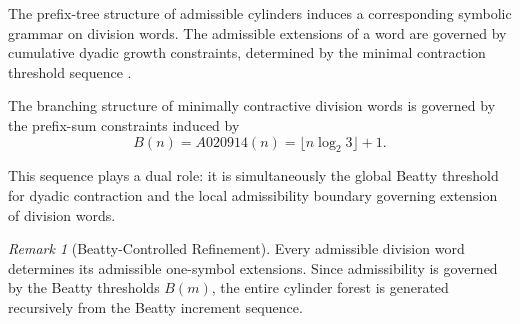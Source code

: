 \documentclass[12pt, oneside]{article}
\numberwithin{equation}{section}
\theoremstyle{definition}
\newtheorem{definition}{Definition}[section]
\theoremstyle{plain}
\theoremstyle{remark}
\newtheorem*{remark}{Remark}
\begin{document}
The prefix-tree structure of admissible cylinders induces a corresponding
symbolic grammar on division words. The admissible extensions of a word
are governed by cumulative dyadic growth constraints, determined by the
minimal contraction threshold sequence .

The branching structure of minimally contractive division words is governed
by the prefix-sum constraints induced by
\[
B(n)=A020914(n)=\lfloor n\log_2 3\rfloor+1.
\]



This sequence plays a dual role: it is simultaneously the global Beatty
threshold for dyadic contraction and the local admissibility boundary
governing extension of division words.

\begin{remark}[Beatty-Controlled Refinement]
Every admissible division word determines its admissible one-symbol
extensions. Since admissibility is governed by the Beatty thresholds
\(B(m)\), the entire cylinder forest is generated recursively from
the Beatty increment sequence.
\end{remark}

\end{document}
